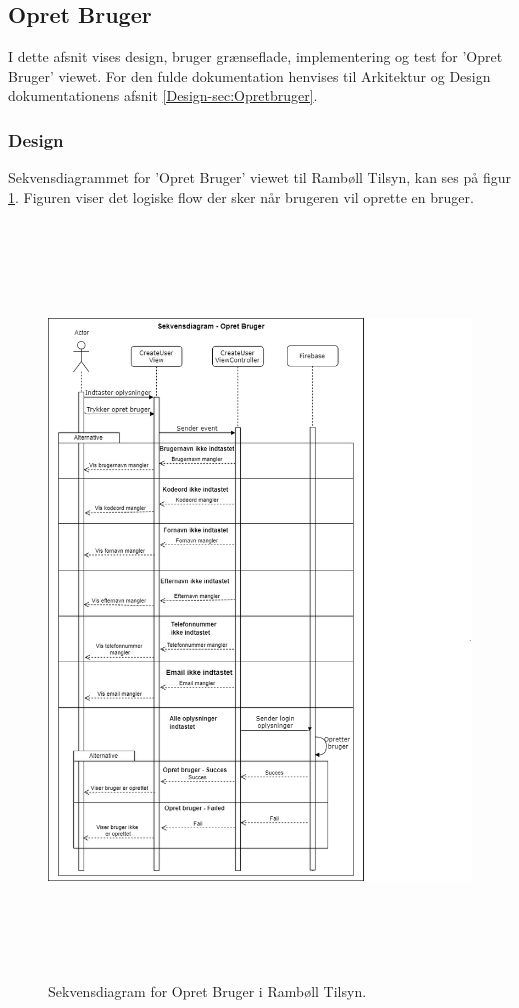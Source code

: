 \subsection{Opret Bruger}
I dette afsnit vises design, bruger grænseflade, implementering og test for 'Opret Bruger' viewet. For den fulde dokumentation henvises til Arkitektur og Design dokumentationens afsnit \ref{Design-sec:Opretbruger}.
\subsubsection{Design}
Sekvensdiagrammet for 'Opret Bruger' viewet til Rambøll Tilsyn, kan ses på figur \ref{fig:OpretBrugerSekvens}. Figuren viser det logiske flow der sker når brugeren vil oprette en bruger.
\begin{figure}[H] %
	\centering
	\includegraphics[height=20cm, width=15cm]{Design/Applikation/OpretBruger/OpretBrugerSekvensDiagram}
	\caption{Sekvensdiagram for Opret Bruger i Rambøll Tilsyn.}
	\label{fig:OpretBrugerSekvens}
\end{figure}

